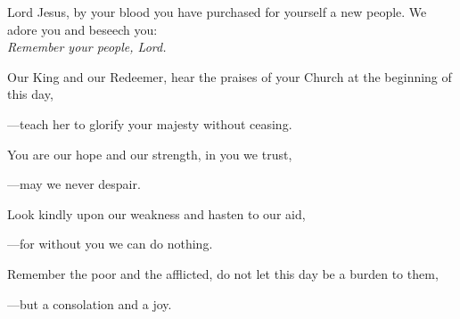 \intercessions\indent

\begin{hangpar}

Lord Jesus, by your blood you have purchased for yourself a new people. We adore you and beseech you:\\
\emph{Remember your people, Lord.}

\medskip Our King and our Redeemer, hear the praises of your Church at the beginning of this day,

{\color{red}---\thinspace}teach her to glorify your majesty without ceasing.

\medskip You are our hope and our strength, in you we trust,

{\color{red}---\thinspace}may we never despair.

\medskip Look kindly upon our weakness and hasten to our aid,

{\color{red}---\thinspace}for without you we can do nothing.

\medskip Remember the poor and the afflicted, do not let this day be a burden to them,

{\color{red}---\thinspace}but a consolation and a joy.

\end{hangpar}

